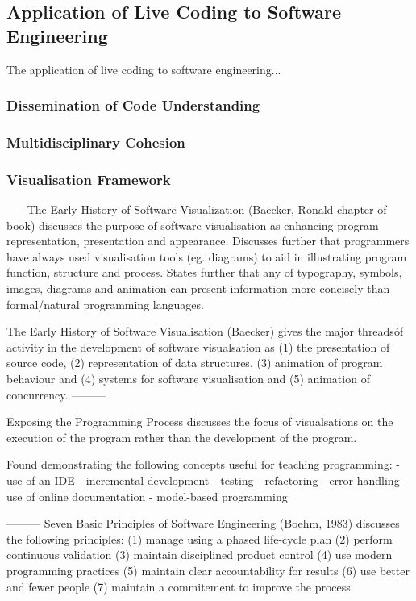 \subsection{Application of Live Coding to Software Engineering}
The application of live coding to software engineering...

\subsubsection{Dissemination of Code Understanding}


\subsubsection{Multidisciplinary Cohesion}

\subsubsection{Visualisation Framework}






-----
The Early History of Software Visualization (Baecker, Ronald chapter of book) discusses the purpose of software visualisation as enhancing program representation, presentation and appearance. Discusses further that programmers have always used visualisation tools (eg. diagrams) to aid in illustrating program function, structure and process. States further that any of typography, symbols, images, diagrams and animation can present information more concisely than formal/natural programming languages. 

The Early History of Software Visualisation (Baecker) gives the major \'threads\' of activity in the development of software visualsation as (1) the presentation of source code, (2) representation of data structures, (3) animation of program behaviour and (4) systems for software visualisation and (5) animation of concurrency.
---------

Exposing the Programming Process discusses the focus of visualsations on the execution of the program rather than the development of the program.

Found demonstrating the following concepts useful for teaching programming:
- use of an IDE
- incremental development
- testing
- refactoring
- error handling
- use of online documentation
- model-based programming

---------
Seven Basic Principles of Software Engineering (Boehm, 1983) discusses the following principles:
(1) manage using a phased life-cycle plan
(2) perform continuous validation
(3) maintain disciplined product control
(4) use modern programming practices
(5) maintain clear accountability for results
(6) use better and fewer people
(7) maintain a commitement to improve the process

